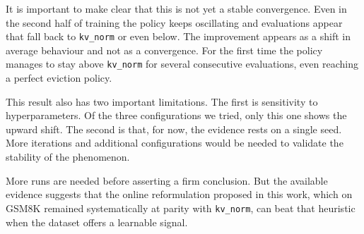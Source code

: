 It is important to make clear that this is not yet a stable convergence. Even in the second half of training the policy keeps oscillating and evaluations appear that fall back to \texttt{kv\_norm} or even below. The improvement appears as a shift in average behaviour and not as a convergence. For the first time the policy manages to stay above \texttt{kv\_norm} for several consecutive evaluations, even reaching a perfect eviction policy.



This result also has two important limitations. The first is sensitivity to hyperparameters. Of the three configurations we tried, only this one shows the upward shift. The second is that, for now, the evidence rests on a single seed. More iterations and additional configurations would be needed to validate the stability of the phenomenon.

More runs are needed before asserting a firm conclusion. But the available evidence suggests that the online reformulation proposed in this work, which on GSM8K remained systematically at parity with \texttt{kv\_norm}, can beat that heuristic when the dataset offers a learnable signal.
